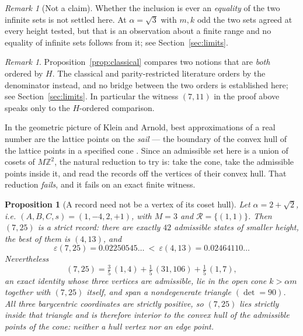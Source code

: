 \documentclass[11pt]{article}
\newtheorem{proposition}[theorem]{Proposition}
\theoremstyle{definition}
\theoremstyle{remark}
\newtheorem{remark}[theorem]{Remark}
\newcommand{\Z}{\mathbb{Z}}
\begin{document}
\begin{remark}[Not a claim]\label{rem:noteq}
Whether the inclusion is ever an \emph{equality} of the two infinite sets is not settled here.
At $\alpha=\sqrt3$ with $m,k$ odd the two sets agreed at every height tested, but that is an
observation about a finite range and no equality of infinite sets follows from it; see
Section~\ref{sec:limits}.
\end{remark}

\begin{remark}\label{rem:order2}
Proposition~\ref{prop:classical} compares two notions that are \emph{both} ordered by $H$. The
classical and parity-restricted literature \cite{KimLeeLiao2022,KimLeeLiao2025,KushwahaSarma}
orders by the denominator instead, and no bridge between the two orders is established here;
see Section~\ref{sec:limits}. In particular the witness $(7,11)$ in the proof above speaks only
to the $H$-ordered comparison.
\end{remark}

In the geometric picture of Klein and Arnold, best approximations of a real number are the
lattice points on the \emph{sail} --- the boundary of the convex hull of the lattice points in a
specified cone \cite{Karpenkov2013,SpaldingVeselov}. Since an admissible set here is a union of
cosets of $M\Z^2$, the natural reduction to try is: take the cone, take the admissible points
inside it, and read the records off the vertices of their convex hull. That reduction
\emph{fails}, and it fails on an exact finite witness.

\begin{proposition}[A record need not be a vertex of its coset hull]\label{prop:sail}
Let $\alpha=2+\sqrt2$, i.e. $(A,B,C,s)=(1,-4,2,+1)$, with $M=3$ and
$\mathcal R=\{(1,1)\}$. Then $(7,25)$ is a strict record: there are exactly $42$ admissible
states of smaller height, the best of them is $(4,13)$, and
\[
\varepsilon(7,25)=0.02250545\ldots\ <\ \varepsilon(4,13)=0.02464110\ldots
\]
Nevertheless
\begin{equation}\label{eq:sail}
(7,25)=\tfrac35\,(1,4)+\tfrac15\,(31,106)+\tfrac15\,(1,7),
\end{equation}
an exact identity whose three vertices are admissible, lie in the open cone $k>\alpha m$
together with $(7,25)$ itself, and span a nondegenerate triangle $(\det=90)$. All three
barycentric coordinates are strictly positive, so $(7,25)$ lies \emph{strictly inside} that
triangle and is therefore interior to the convex hull of the admissible points of the cone:
neither a hull vertex nor an edge point.
\end{proposition}
\end{document}

